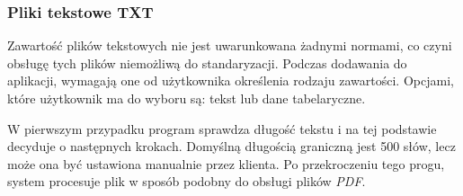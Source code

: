 \documentclass[12pt,a4paper,twoside]{article}
\begin{document}
\subsubsection*{Pliki tekstowe TXT}
Zawartość plików tekstowych nie jest uwarunkowana żadnymi normami, co czyni obsługę tych plików niemożliwą do standaryzacji. Podczas dodawania do aplikacji, wymagają one od użytkownika określenia rodzaju zawartości. Opcjami, które użytkownik ma do wyboru są: tekst lub dane tabelaryczne.\par
W pierwszym przypadku program sprawdza długość tekstu i na tej podstawie decyduje o następnych krokach. Domyślną długością graniczną jest 500 słów, lecz może ona być ustawiona manualnie przez klienta. Po przekroczeniu tego progu, system procesuje plik w sposób podobny do obsługi plików \textit{PDF}.\par
\newpage
\end{document}
